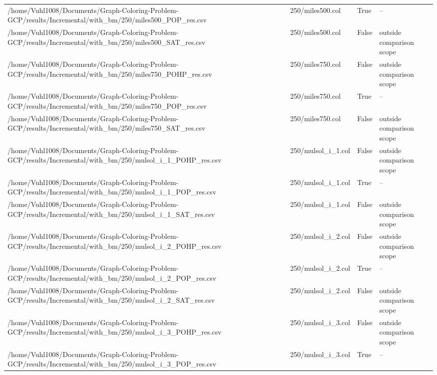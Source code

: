 \begin{table}[htbp]
\begin{tabular}{llll}
/home/Vuhl1008/Documents/Graph-Coloring-Problem-GCP/results/Incremental/with\_bm/250/miles500\_POP\_res.csv & 250/miles500.col & True & -- \\
/home/Vuhl1008/Documents/Graph-Coloring-Problem-GCP/results/Incremental/with\_bm/250/miles500\_SAT\_res.csv & 250/miles500.col & False & outside comparison scope \\
/home/Vuhl1008/Documents/Graph-Coloring-Problem-GCP/results/Incremental/with\_bm/250/miles750\_POHP\_res.csv & 250/miles750.col & False & outside comparison scope \\
/home/Vuhl1008/Documents/Graph-Coloring-Problem-GCP/results/Incremental/with\_bm/250/miles750\_POP\_res.csv & 250/miles750.col & True & -- \\
/home/Vuhl1008/Documents/Graph-Coloring-Problem-GCP/results/Incremental/with\_bm/250/miles750\_SAT\_res.csv & 250/miles750.col & False & outside comparison scope \\
/home/Vuhl1008/Documents/Graph-Coloring-Problem-GCP/results/Incremental/with\_bm/250/mulsol\_i\_1\_POHP\_res.csv & 250/mulsol\_i\_1.col & False & outside comparison scope \\
/home/Vuhl1008/Documents/Graph-Coloring-Problem-GCP/results/Incremental/with\_bm/250/mulsol\_i\_1\_POP\_res.csv & 250/mulsol\_i\_1.col & True & -- \\
/home/Vuhl1008/Documents/Graph-Coloring-Problem-GCP/results/Incremental/with\_bm/250/mulsol\_i\_1\_SAT\_res.csv & 250/mulsol\_i\_1.col & False & outside comparison scope \\
/home/Vuhl1008/Documents/Graph-Coloring-Problem-GCP/results/Incremental/with\_bm/250/mulsol\_i\_2\_POHP\_res.csv & 250/mulsol\_i\_2.col & False & outside comparison scope \\
/home/Vuhl1008/Documents/Graph-Coloring-Problem-GCP/results/Incremental/with\_bm/250/mulsol\_i\_2\_POP\_res.csv & 250/mulsol\_i\_2.col & True & -- \\
/home/Vuhl1008/Documents/Graph-Coloring-Problem-GCP/results/Incremental/with\_bm/250/mulsol\_i\_2\_SAT\_res.csv & 250/mulsol\_i\_2.col & False & outside comparison scope \\
/home/Vuhl1008/Documents/Graph-Coloring-Problem-GCP/results/Incremental/with\_bm/250/mulsol\_i\_3\_POHP\_res.csv & 250/mulsol\_i\_3.col & False & outside comparison scope \\
/home/Vuhl1008/Documents/Graph-Coloring-Problem-GCP/results/Incremental/with\_bm/250/mulsol\_i\_3\_POP\_res.csv & 250/mulsol\_i\_3.col & True & -- \\

\end{tabular}
\end{table}
